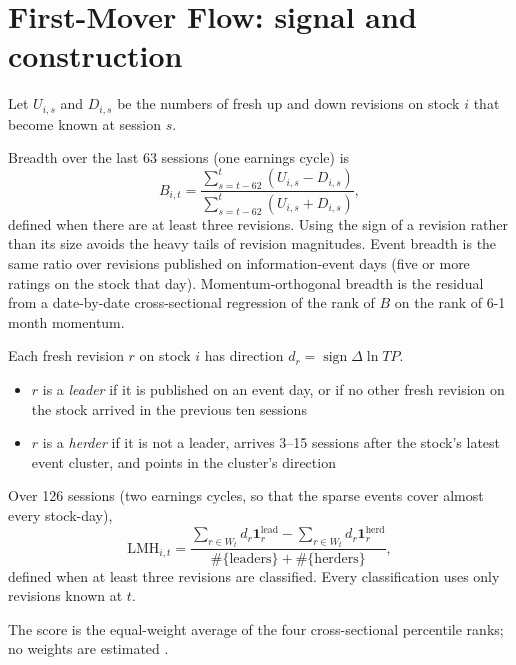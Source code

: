 \section{First-Mover Flow: signal and construction}\label{sec:fmf}

Let $U_{i,s}$ and $D_{i,s}$ be the numbers of fresh up and down revisions on stock $i$ that become known at session $s$.

 Breadth over the last 63 sessions (one earnings cycle) is
\begin{equation}
B_{i,t}=\frac{\sum_{s=t-62}^{t}\left(U_{i,s}-D_{i,s}\right)}{\sum_{s=t-62}^{t}\left(U_{i,s}+D_{i,s}\right)},\label{eq:breadth}
\end{equation}
defined when there are at least three revisions. Using the sign of a revision rather than its size avoids the heavy tails of revision magnitudes. Event breadth is the same ratio over revisions published on information-event days (five or more ratings on the stock that day). Momentum-orthogonal breadth is the residual from a date-by-date cross-sectional regression of the rank of $B$ on the rank of 6-1 month momentum.

 Each fresh revision $r$ on stock $i$ has direction $d_r=\operatorname{sign}\Delta\ln TP$.
\begin{itemize}
  \item $r$ is a \emph{leader} if it is published on an event day, or if no other fresh revision on the stock arrived in the previous ten sessions
  \item $r$ is a \emph{herder} if it is not a leader, arrives 3--15 sessions after the stock's latest event cluster, and points in the cluster's direction
\end{itemize}
Over 126 sessions (two earnings cycles, so that the sparse events cover almost every stock-day),
\begin{equation}
\mathrm{LMH}_{i,t}=\frac{\sum_{r\in W_t} d_r\mathbf 1^{\text{lead}}_r-\sum_{r\in W_t} d_r\mathbf 1^{\text{herd}}_r}{\#\{\text{leaders}\}+\#\{\text{herders}\}},\label{eq:lmh}
\end{equation}
defined when at least three revisions are classified. Every classification uses only revisions known at $t$.

 The score is the equal-weight average of the four cross-sectional percentile ranks; no weights are estimated \citep{demiguel2009}.


